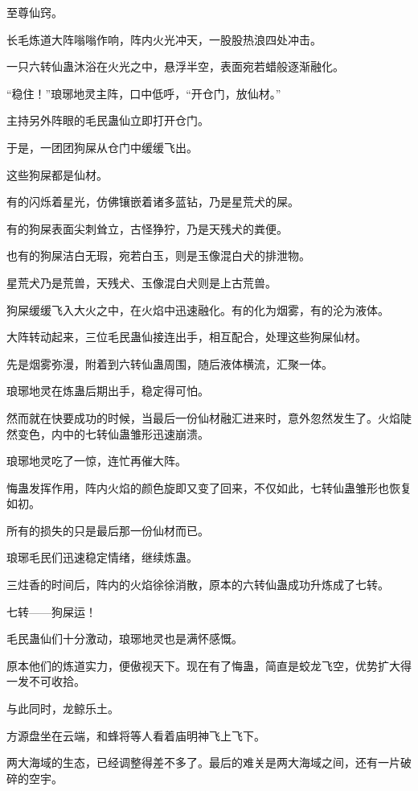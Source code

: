 
\begin{this_body}

至尊仙窍。

长毛炼道大阵嗡嗡作响，阵内火光冲天，一股股热浪四处冲击。

一只六转仙蛊沐浴在火光之中，悬浮半空，表面宛若蜡般逐渐融化。

“稳住！”琅琊地灵主阵，口中低呼，“开仓门，放仙材。”

主持另外阵眼的毛民蛊仙立即打开仓门。

于是，一团团狗屎从仓门中缓缓飞出。

这些狗屎都是仙材。

有的闪烁着星光，仿佛镶嵌着诸多蓝钻，乃是星荒犬的屎。

有的狗屎表面尖刺耸立，古怪狰狞，乃是天残犬的粪便。

也有的狗屎洁白无瑕，宛若白玉，则是玉像混白犬的排泄物。

星荒犬乃是荒兽，天残犬、玉像混白犬则是上古荒兽。

狗屎缓缓飞入大火之中，在火焰中迅速融化。有的化为烟雾，有的沦为液体。

大阵转动起来，三位毛民蛊仙接连出手，相互配合，处理这些狗屎仙材。

先是烟雾弥漫，附着到六转仙蛊周围，随后液体横流，汇聚一体。

琅琊地灵在炼蛊后期出手，稳定得可怕。

然而就在快要成功的时候，当最后一份仙材融汇进来时，意外忽然发生了。火焰陡然变色，内中的七转仙蛊雏形迅速崩溃。

琅琊地灵吃了一惊，连忙再催大阵。

悔蛊发挥作用，阵内火焰的颜色旋即又变了回来，不仅如此，七转仙蛊雏形也恢复如初。

所有的损失的只是最后那一份仙材而已。

琅琊毛民们迅速稳定情绪，继续炼蛊。

三炷香的时间后，阵内的火焰徐徐消散，原本的六转仙蛊成功升炼成了七转。

七转——狗屎运！

毛民蛊仙们十分激动，琅琊地灵也是满怀感慨。

原本他们的炼道实力，便傲视天下。现在有了悔蛊，简直是蛟龙飞空，优势扩大得一发不可收拾。

与此同时，龙鲸乐土。

方源盘坐在云端，和蜂将等人看着庙明神飞上飞下。

两大海域的生态，已经调整得差不多了。最后的难关是两大海域之间，还有一片破碎的空宇。


\end{this_body}

